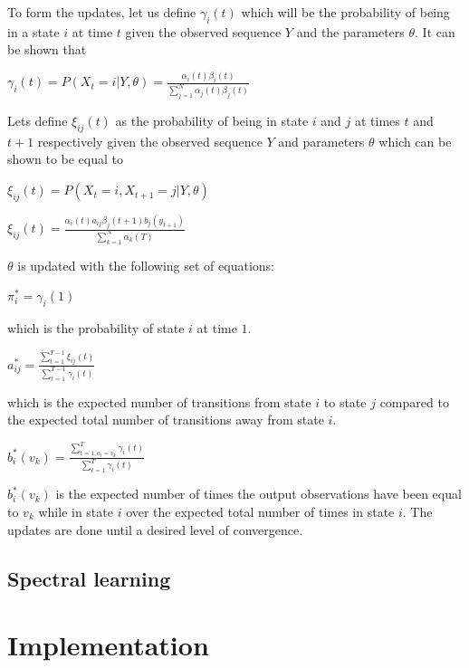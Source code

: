 \documentclass[letterpaper]{article}
\begin{document}
To form the updates, let us define $\gamma_{i}(t)$ which will be the probability of being in a state $i$ at time $t$ given the observed sequence $Y$ and the parameters $\theta$. It can be shown that

$
\gamma_{i}(t)=P(X_{t}=i|Y,\theta) = \frac{\alpha_{i}(t)\beta_{i}(t)}{\sum_{j=1}^N \alpha_{j}(t)\beta_{j}(t)}
$

Lets define $\xi_{ij}(t)$ as the probability of being in state $i$ and $j$ at times $t$ and $t+1$ respectively given the observed sequence $Y$ and parameters $\theta$ which can be shown to be equal to

\begin{center}

$\xi_{ij}(t)=P(X_{t}=i,X_{t+1}=j|Y,\theta)$

$\xi_{ij}(t)=\frac{\alpha_{i}(t) a_{ij} \beta_{j}(t+1) b_{j}(y_{t+1})}{\sum_{k=1}^N \alpha_k(T)}$
\end{center}

$\theta$ is updated with the following set of equations:

\begin{center}
$\pi_{i}^* = \gamma_{i}(1)$
\end{center}

which is the probability of state $i$ at time $1$.

\begin{center}
$a_{ij}^*=\frac{\sum^{T-1}_{t=1}\xi_{ij}(t)}{\sum^{T-1}_{t=1}\gamma_{i}(t)}$
\end{center}

which is the expected number of transitions from state $i$ to state $j$ compared to the expected total number of transitions away from state $i$.

\begin{center}
$b_{i}^*(v_{k})=\frac{\sum^T_{t=1,o_{t}=v_{k}} \gamma_{i}(t)}{\sum^T_{t=1} \gamma_i(t)}$
\end{center}

$b_{i}^*(v_{k})$ is the expected number of times the output observations have been equal to $v_{k}$ while in state $i$ over the expected total number of times in state $i$. The updates are done until a desired level of convergence.

\subsection{Spectral learning}

\section{Implementation}
\end{document}
